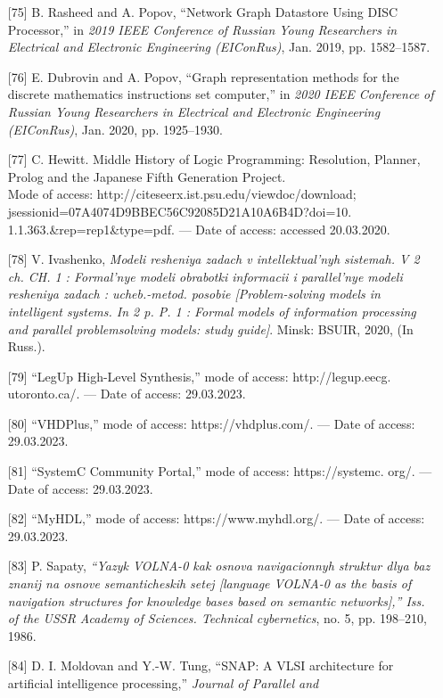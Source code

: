 \documentclass[10pt]{article}
\begin{document}
{\begin{multicols*}{2}
\begin{enumerate}
{systems,” \textit{Doklady BGUIR}, vol. 18, pp. 33–40, 10 2020.}
\item[{[75]}]{B. Rasheed and A. Popov, “Network Graph Datastore Using
DISC Processor,” in \textit{2019 IEEE Conference of Russian Young
Researchers in Electrical and Electronic Engineering (EIConRus)},
Jan. 2019, pp. 1582–1587.} 
\item[{[76]}] {E. Dubrovin and A. Popov, “Graph representation methods for
the discrete mathematics instructions set computer,” in \textit{2020
IEEE Conference of Russian Young Researchers in Electrical and
Electronic Engineering (EIConRus)}, Jan. 2020, pp. 1925–1930.}
\item[{[77]}]{C. Hewitt. Middle History of Logic Programming: Resolution,
Planner, Prolog and the Japanese Fifth Generation Project.\\
Mode of access: http://citeseerx.ist.psu.edu/viewdoc/download;\\
jsessionid=07A4074D9BBEC56C92085D21A10A6B4D?doi=10.
1.1.363.\&rep=rep1\&type=pdf. — Date of access: accessed
20.03.2020.
}
\item[{[78]}]{V. Ivashenko, \textit{Modeli resheniya zadach v intellektual’nyh sistemah.
V 2 ch. CH. 1 : Formal’nye modeli obrabotki informacii i
parallel’nye modeli resheniya zadach : ucheb.-metod. posobie
[Problem-solving models in intelligent systems. In 2 p. P. 1 :
Formal models of information processing and parallel problem\-solving models: study guide]}. Minsk: BSUIR, 2020, (In Russ.).}
\item[{[79]}]{“LegUp High-Level Synthesis,” mode of access: http://legup.eecg.
utoronto.ca/. — Date of access: 29.03.2023.} 
\item[{[80]}]{“VHDPlus,” mode of access: https://vhdplus.com/. — Date of
access: 29.03.2023.}
\item[{[81]}]{“SystemC Community Portal,” mode of access: https://systemc.
org/. — Date of access: 29.03.2023.}
\item[{[82]}]{“MyHDL,” mode of access: https://www.myhdl.org/. — Date of
access: 29.03.2023.} 
\item[{[83]}]{P. Sapaty, \textit{“Yazyk VOLNA-0 kak osnova navigacionnyh struktur
dlya baz znanij na osnove semanticheskih setej [language VOLNA-0 as the basis of navigation structures for knowledge bases based
on semantic networks],” Iss. of the USSR Academy of Sciences.
Technical cybernetics}, no. 5, pp. 198–210, 1986.} 
\item[{[84]}]{D. I. Moldovan and Y.-W. Tung, “SNAP: A VLSI architecture
for artificial intelligence processing,” \textit{Journal of Parallel and
}}
\end{enumerate}
\end{multicols*}}
\end{document}
